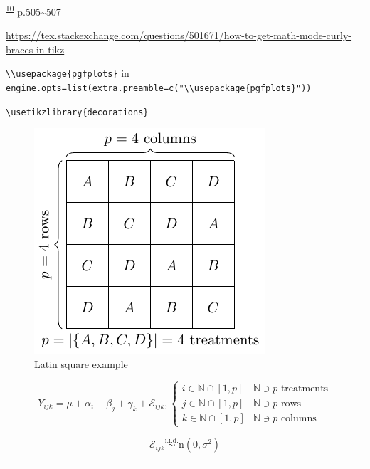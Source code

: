 \documentclass[
]{book}
\theoremstyle{definition}
\theoremstyle{definition}
\theoremstyle{definition}
\theoremstyle{definition}
\theoremstyle{remark}
\begin{document}
\textsuperscript{\protect\hyperlink{ref-zhang2021}{10}} p.505\textasciitilde507

\url{https://tex.stackexchange.com/questions/501671/how-to-get-math-mode-curly-braces-in-tikz}

\texttt{\textbackslash{}\textbackslash{}usepackage\{pgfplots\}} in \texttt{engine.opts=list(extra.preamble=c("\textbackslash{}\textbackslash{}usepackage\{pgfplots\}"))}

\texttt{\textbackslash{}usetikzlibrary\{decorations\}}

\begin{figure}
\centering
\includegraphics{202403232342-experimental-design_files/figure-latex/unnamed-chunk-2-1.pdf}
\caption{\label{fig:unnamed-chunk-2}Latin square example}
\end{figure}

\[
Y_{{\scriptscriptstyle ijk}}=\mu+\alpha_{{\scriptscriptstyle i}}+\beta_{{\scriptscriptstyle j}}+\gamma_{{\scriptscriptstyle k}}+\mathcal{E}_{{\scriptscriptstyle ijk}},\begin{cases}
i\in\mathbb{N}\cap\left[1,p\right] & \mathbb{N}\ni p\text{ treatments}\\
j\in\mathbb{N}\cap\left[1,p\right] & \mathbb{N}\ni p\text{ rows}\\
k\in\mathbb{N}\cap\left[1,p\right] & \mathbb{N}\ni p\text{ columns}
\end{cases}
\]

\[
\mathcal{E}_{{\scriptscriptstyle ijk}}\overset{\text{i.i.d.}}{\sim}\mathrm{n}\left(0,\sigma^{2}\right)
\]

\begin{center}\rule{0.5\linewidth}{0.5pt}\end{center}
\end{document}
